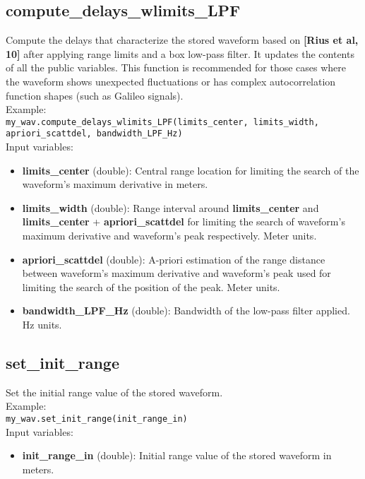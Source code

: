 \subsection{compute\_delays\_wlimits\_LPF}

Compute the delays that characterize the stored waveform based on {\bf [Rius et al, 10]} after applying range limits and a box low-pass filter. It updates the contents of all the public variables. This function is recommended for those cases where the waveform shows unexpected fluctuations or has complex autocorrelation function shapes (such as Galileo signals).\\

Example:\\

\texttt{my\_wav.compute\_delays\_wlimits\_LPF(limits\_center, limits\_width, apriori\_scattdel, bandwidth\_LPF\_Hz)}\\

Input variables:
\begin{itemize}
\item {\bf limits\_center} (double): Central range location for limiting the search of the waveform's maximum derivative in meters.
\item {\bf limits\_width} (double): Range interval around {\bf limits\_center} and {\bf limits\_center} + {\bf apriori\_scattdel} for limiting the search of waveform's maximum derivative and waveform's peak respectively. Meter units. 
\item {\bf apriori\_scattdel} (double): A-priori estimation of the range distance between waveform's maximum derivative and waveform's peak used for limiting the search of the position of the peak. Meter units.
\item {\bf bandwidth\_LPF\_Hz} (double): Bandwidth of the low-pass filter applied. Hz units.
\end{itemize}


\subsection{set\_init\_range}

Set the initial range value of the stored waveform.\\

Example:\\

\texttt{my\_wav.set\_init\_range(init\_range\_in)}\\

Input variables:
\begin{itemize}
\item {\bf init\_range\_in} (double): Initial range value of the stored waveform in meters.
\end{itemize}


